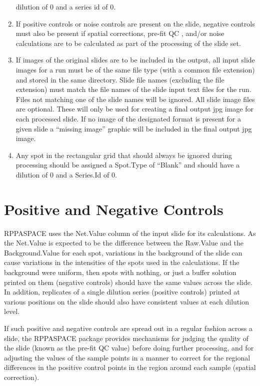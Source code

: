\documentclass[
]{article}
\begin{document}
\begin{enumerate}
  dilution of 0 and a series id of 0.
\item
  If positive controls or noise controls are present on the slide,
  negative controls must also be present if spatial corrections, pre-fit
  QC , and/or noise calculations are to be calculated as part of the
  processing of the slide set.
\item
  If images of the original slides are to be included in the output, all
  input slide images for a run must be of the same file type (with a
  common file extension) and stored in the same directory. Slide file
  names (excluding the file extension) must match the file names of the
  slide input text files for the run. Files not matching one of the
  slide names will be ignored. All slide image files are optional. These
  will only be used for creating a final output jpg image for each
  processed slide. If no image of the designated format is present for a
  given slide a ``missing image'' graphic will be included in the final
  output jpg image.
\item
  Any spot in the rectangular grid that should always be ignored during
  processing should be assigned a Spot.Type of ``Blank'' and should have
  a dilution of 0 and a Series.Id of 0.
\end{enumerate}

\hypertarget{controls}{%
\section{Positive and Negative Controls}\label{controls}}

RPPASPACE uses the Net.Value column of the input slide for its
calculations. As the Net.Value is expected to be the difference between
the Raw.Value and the Background.Value for each spot, variations in the
background of the slide can cause variations in the intensities of the
spots used in the calculations. If the background were uniform, then
spots with nothing, or just a buffer solution printed on them (negative
controls) should have the same values across the slide. In addition,
replicates of a single dilution series (positive controls) printed at
various positions on the slide should also have consistent values at
each dilution level.

If such positive and negative controls are spread out in a regular
fashion across a slide, the RPPASPACE package provides mechanisms for
judging the quality of the slide (known as the pre-fit QC value) before
doing further processing, and for adjusting the values of the sample
points in a manner to correct for the regional differences in the
positive control points in the region around each sample (spatial
correction).
\end{document}
